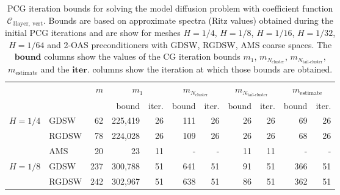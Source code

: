 \begin{table}[H]
\centering
\caption{PCG iteration bounds for solving the model diffusion problem with coefficient function $\mathcal{C}_{\mathrm{3layer, \ vert}}$. Bounds are based on approximate spectra (Ritz values) obtained during the initial PCG iterations and are show for meshes $H=1/4$, $H=1/8$, $H=1/16$, $H=1/32$, $H=1/64$ and 2-OAS preconditioners with GDSW, RGDSW, AMS coarse spaces. The $\textbf{bound}$ columns show the values of the CG iteration bounds $m_1$, $m_{N_{\text{cluster}}}$, $m_{N_{\text{tail-cluster}}}$, $m_{\text{estimate}}$ and the $\textbf{iter.}$ columns show the iteration at which those bounds are obtained.}
\label{tab:cg_iteration_bound_coef=3lvert}
\begin{tabular}{llrrrrrrrrr}
\toprule
 &  & \bfseries $m$ & \multicolumn{2}{|c|}{\bfseries $m_1$} & \multicolumn{2}{|c|}{\bfseries $m_{N_{\text{cluster}}}$} & \multicolumn{2}{|c|}{\bfseries $m_{N_{\text{tail-cluster}}}$} & \multicolumn{2}{|c|}{\bfseries $m_{\text{estimate}}$} \\
 &  &  & bound & iter. & bound & iter. & bound & iter. & bound & iter. \\
\midrule
\multirow[c]{3}{*}{\bfseries $H=1/4$} & GDSW & 62 & {\cellcolor[HTML]{E2E4FB}} \color[HTML]{000000} 225,419 & 26 & {\cellcolor[HTML]{ACB8F4}} \color[HTML]{000000} 111 & 26 & {\cellcolor[HTML]{768BEC}} \color[HTML]{F1F1F1} 26 & 26 & {\cellcolor[HTML]{405FE5}} \color[HTML]{F1F1F1} 69 & 26 \\
\cline{2-11}
\bfseries  & RGDSW & 78 & {\cellcolor[HTML]{E2E4FB}} \color[HTML]{000000} 224,028 & 26 & {\cellcolor[HTML]{768BEC}} \color[HTML]{F1F1F1} 109 & 26 & {\cellcolor[HTML]{ACB8F4}} \color[HTML]{000000} 26 & 26 & {\cellcolor[HTML]{405FE5}} \color[HTML]{F1F1F1} 68 & 26 \\
\cline{2-11}
\bfseries  & AMS & 20 & {\cellcolor[HTML]{405FE5}} \color[HTML]{F1F1F1} 23 & 11 & {\cellcolor[HTML]{ACB8F4}} \color[HTML]{000000} {\cellcolor[HTML]{E2E4FB}} - & - & {\cellcolor[HTML]{768BEC}} \color[HTML]{F1F1F1} 11 & 11 & {\cellcolor[HTML]{E2E4FB}} \color[HTML]{000000} {\cellcolor[HTML]{E2E4FB}} - & - \\
\cline{1-11} \cline{2-11}
\multirow[c]{3}{*}{\bfseries $H=1/8$} & GDSW & 237 & {\cellcolor[HTML]{E2E4FB}} \color[HTML]{000000} 300,788 & 51 & {\cellcolor[HTML]{ACB8F4}} \color[HTML]{000000} 641 & 51 & {\cellcolor[HTML]{768BEC}} \color[HTML]{F1F1F1} 91 & 51 & {\cellcolor[HTML]{405FE5}} \color[HTML]{F1F1F1} 366 & 51 \\
\cline{2-11}
\bfseries  & RGDSW & 242 & {\cellcolor[HTML]{E2E4FB}} \color[HTML]{000000} 302,967 & 51 & {\cellcolor[HTML]{ACB8F4}} \color[HTML]{000000} 638 & 51 & {\cellcolor[HTML]{768BEC}} \color[HTML]{F1F1F1} 86 & 51 & {\cellcolor[HTML]{405FE5}} \color[HTML]{F1F1F1} 362 & 51 \\

\end{tabular}
\end{table}
